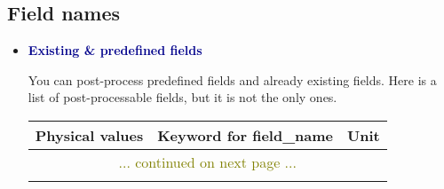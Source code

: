 \subsection{Field names}
\begin{itemize}
\item \textcolor{darkblue}{\textbf{Existing \& predefined fields}}

You can post-process predefined fields and already existing fields.
Here is a list of post-processable fields, but it is not the only ones.

\small
\begin{longtable}[hcr]{|c|c|c|}
\hline \textbf{Physical values}                        & \textbf{Keyword for field\_name}          & \textbf{Unit} \\ \hline \endhead
\hline\multicolumn{3}{|c|}{\textcolor{olive}{... continued on next page ...}}  \\ \hline \endfoot
\hline \hline \endlastfoot



\end{longtable}
\end{itemize}
